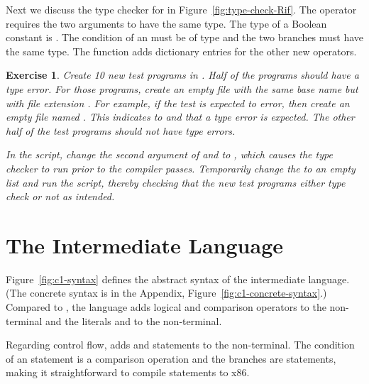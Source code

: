 \documentclass[11pt]{book}
\newtheorem{exercise}[theorem]{Exercise}
\begin{document}
{Next we discuss the type checker for \LangIf{} in
Figure~\ref{fig:type-check-Rif}.  The operator  requires the
two arguments to have the same type. The type of a Boolean constant is
. The condition of an  must be of
 type and the two branches must have the same type.  The
 function adds dictionary entries for the other
new operators.

\begin{exercise}\normalfont
Create 10 new test programs in \LangIf{}. Half of the programs should
have a type error. For those programs, create an empty file with the
same base name but with file extension . For example, if
the test  is expected to error, then create
an empty file named .  This indicates to
 and  that a type error is
expected. The other half of the test programs should not have type
errors.

In the  script, change the second argument of
 and  to
, which causes the type checker to run prior to
the compiler passes. Temporarily change the  to an empty
list and run the script, thereby checking that the new test programs
either type check or not as intended.
\end{exercise}


\section{The \LangCIf{} Intermediate Language}
\label{sec:Cif}

Figure~\ref{fig:c1-syntax} defines the abstract syntax of the
\LangCIf{} intermediate language. (The concrete syntax is in the
Appendix, Figure~\ref{fig:c1-concrete-syntax}.)  Compared to
\LangCVar{}, the \LangCIf{} language adds logical and comparison
operators to the \Exp{} non-terminal and the literals  and
 to the \Arg{} non-terminal.

Regarding control flow, \LangCIf{} adds  and 
statements to the \Tail{} non-terminal. The condition of an 
statement is a comparison operation and the branches are 
statements, making it straightforward to compile  statements
to x86.


}
\end{document}
